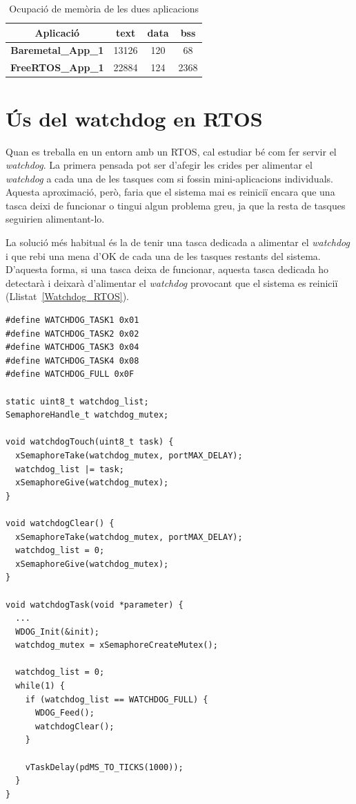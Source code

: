 \begin{table}[!htbp]
\caption{Ocupació de memòria de les dues aplicacions}
\centering
\begin{tabular}{|c|c|c|c|}
\hline
{\bf Aplicació} & {\bf text} & {\bf data} & {\bf bss}\\
\hline
{\bf Baremetal\_App\_1} & 13126 & 120 & 68\\
\hline
{\bf FreeRTOS\_App\_1} & 22884 & 124 & 2368\\
\hline
\end{tabular}
\label{tb:bin_size}
\end{table}


\chapter{Ús del {\bf watchdog} en RTOS}
Quan es treballa en un entorn amb un RTOS, cal estudiar bé com fer servir el {\em watchdog}. La primera pensada pot ser d'afegir les crides per alimentar el {\em watchdog} a cada una de les tasques com si fossin mini-aplicacions individuals. Aquesta aproximació, però, faria que el sistema mai es reiniciï encara que una tasca deixi de funcionar o tingui algun problema greu, ja que la resta de tasques seguirien alimentant-lo.

La solució més habitual és la de tenir una tasca dedicada a alimentar el {\em watchdog} i que rebi una mena d'OK de cada una de les tasques restants del sistema. D'aquesta forma, si una tasca deixa de funcionar, aquesta tasca dedicada ho detectarà i deixarà d'alimentar el {\em watchdog} provocant que el sistema es reiniciï (Llistat~\ref{Watchdog_RTOS}).

\begin{lstlisting}[style=customc,caption={Codi d'exemple de la tasca de control del {\bf watchdog}},label=Watchdog_RTOS]
#define WATCHDOG_TASK1 0x01
#define WATCHDOG_TASK2 0x02
#define WATCHDOG_TASK3 0x04
#define WATCHDOG_TASK4 0x08
#define WATCHDOG_FULL 0x0F

static uint8_t watchdog_list;
SemaphoreHandle_t watchdog_mutex;

void watchdogTouch(uint8_t task) {
  xSemaphoreTake(watchdog_mutex, portMAX_DELAY);
  watchdog_list |= task;
  xSemaphoreGive(watchdog_mutex);
}

void watchdogClear() {
  xSemaphoreTake(watchdog_mutex, portMAX_DELAY);
  watchdog_list = 0;
  xSemaphoreGive(watchdog_mutex);
}

void watchdogTask(void *parameter) {
  ...
  WDOG_Init(&init);
  watchdog_mutex = xSemaphoreCreateMutex();

  watchdog_list = 0;
  while(1) {
    if (watchdog_list == WATCHDOG_FULL) {
      WDOG_Feed();
      watchdogClear();      
    } 

    vTaskDelay(pdMS_TO_TICKS(1000));
  }
}
\end{lstlisting}

